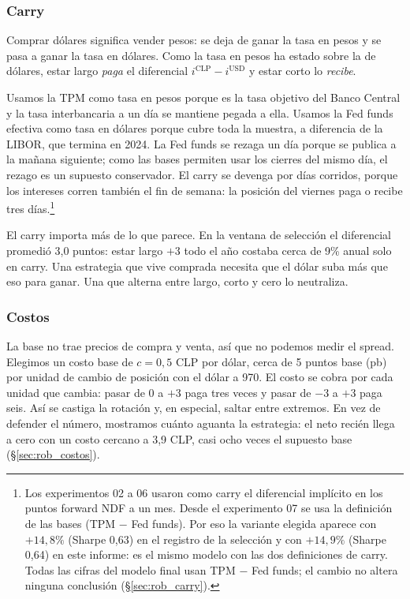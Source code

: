 \documentclass[10pt,a4paper]{article}
\begin{document}
\subsubsection{Carry}

Comprar dólares significa vender pesos: se deja de ganar la tasa en pesos y se pasa a
ganar la tasa en dólares. Como la tasa en pesos ha estado sobre la de dólares, estar
largo \emph{paga} el diferencial $i^{\text{CLP}}-i^{\text{USD}}$ y estar corto lo
\emph{recibe}.

Usamos la TPM como tasa en pesos porque es la tasa objetivo del Banco Central y la tasa
interbancaria a un día se mantiene pegada a ella. Usamos la Fed funds efectiva como tasa
en dólares porque cubre toda la muestra, a diferencia de la LIBOR, que termina en 2024.
La Fed funds se rezaga un día porque se publica a la mañana siguiente; como las bases
permiten usar los cierres del mismo día, el rezago es un supuesto conservador. El carry
se devenga por días corridos, porque los intereses corren también el fin de semana: la
posición del viernes paga o recibe tres días.\footnote{Los experimentos 02 a 06 usaron
como carry el diferencial implícito en los puntos forward NDF a un mes. Desde el
experimento 07 se usa la definición de las bases (TPM $-$ Fed funds). Por eso la
variante elegida aparece con $+14{,}8\%$ (Sharpe 0,63) en el registro de la selección y
con $+14{,}9\%$ (Sharpe 0,64) en este informe: es el mismo modelo con las dos
definiciones de carry. Todas las cifras del modelo final usan TPM $-$ Fed funds; el
cambio no altera ninguna conclusión (§\ref{sec:rob_carry}).}

El carry importa más de lo que parece. En la ventana de selección el diferencial
promedió 3,0 puntos: estar largo $+3$ todo el año costaba cerca de 9\% anual solo en
carry. Una estrategia que vive comprada necesita que el dólar suba más que eso para
ganar. Una que alterna entre largo, corto y cero lo neutraliza.

\subsubsection{Costos}

La base no trae precios de compra y venta, así que no podemos medir el spread. Elegimos
un costo base de $c=0{,}5$ CLP por dólar, cerca de 5 puntos base (pb) por unidad de
cambio de posición con el dólar a 970. El costo se cobra por cada unidad que cambia:
pasar de $0$ a $+3$ paga tres veces y pasar de $-3$ a $+3$ paga seis. Así se castiga la
rotación y, en especial, saltar entre extremos. En vez de defender el número, mostramos
cuánto aguanta la estrategia: el neto recién llega a cero con un costo cercano a 3,9
CLP, casi ocho veces el supuesto base (§\ref{sec:rob_costos}).
\end{document}
